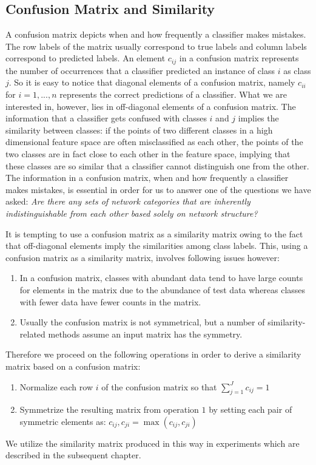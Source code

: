 		\subsection{Confusion Matrix and Similarity}
	A confusion matrix depicts when and how frequently a classifier makes mistakes. The row labels of the matrix usually correspond to  true labels and column labels correspond to predicted labels. An element $c_{ij}$ in a confusion matrix represents the number of occurrences that a classifier predicted an instance of class $i$ as class $j$. So it is easy to notice that diagonal elements of a confusion matrix, namely $c_{ii}$ for $i = 1,...,n$ represents the correct predictions of a classifier. What we are interested in, however, lies in off-diagonal elements of a confusion matrix. The information that a classifier gets confused with classes $i$ and $j$ implies the similarity between classes: if the points of two different classes in a high dimensional feature space are often misclassified as each other, the points of the two classes are in fact close to each other in the feature space, implying that these classes are so similar that a classifier cannot distinguish one from the other. The information in a confusion matrix, when and how frequently a classifier makes mistakes, is essential in order for us to answer one of the questions we have asked: \textit{Are there any sets of network categories that are inherently indistinguishable from each other based solely on network structure?}

It is tempting to use a confusion matrix as a similarity matrix owing to the fact that off-diagonal elements imply the similarities among class labels. This, using a confusion matrix as a similarity matrix, involves following issues however:
\begin{enumerate}
	\item In a confusion matrix, classes with abundant data tend to have large counts for elements in the matrix due to the abundance of test data whereas classes with fewer data have fewer counts in the matrix.
	\item Usually the confusion matrix is not symmetrical, but a number of similarity-related methods assume an input matrix has the symmetry.
\end{enumerate}

Therefore we proceed on the following operations in order to derive a similarity matrix based on a confusion matrix:
\begin{enumerate}
	\item Normalize each row $i$ of the confusion matrix so that $\sum_{j=1}^J c_{ij} = 1$
	\item Symmetrize the resulting matrix from operation $1$ by setting each pair of symmetric elements as: $c_{ij},c_{ji} = \max (c_{ij},c_{ji})$
\end{enumerate}

We utilize the similarity matrix produced in this way in experiments which are described in the subsequent chapter.
